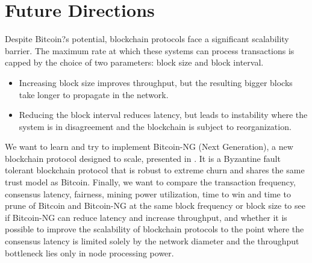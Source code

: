 \documentclass[journal, a4paper]{IEEEtran}
\begin{document}
\section{Future Directions}
Despite Bitcoin?s potential, blockchain protocols face a significant scalability barrier. The maximum rate at which these systems can process transactions is capped by the choice of two parameters: block size and block interval.
\begin{itemize}
    \item Increasing block size improves throughput, but the resulting bigger blocks take longer to propagate in the network.
    \item Reducing the block interval reduces latency, but leads to instability where the system is in disagreement and the blockchain is subject to reorganization.
\end{itemize}
We want to learn and try to implement Bitcoin-NG (Next Generation), a new blockchain protocol designed to scale, presented in \cite{eyal2016bitcoin}. It is a Byzantine fault tolerant blockchain protocol that is robust to extreme churn and shares the same trust model as Bitcoin. Finally, we want to compare the transaction frequency, consensus latency, fairness, mining power utilization, time to win and time to prune of Bitcoin and Bitcoin-NG at the same block frequency or block size to see if Bitcoin-NG can reduce latency and increase throughput, and whether it is possible to improve the scalability of blockchain protocols to the point where the consensus latency is limited solely by the network diameter and the throughput bottleneck lies only in node processing power.






\end{document}
